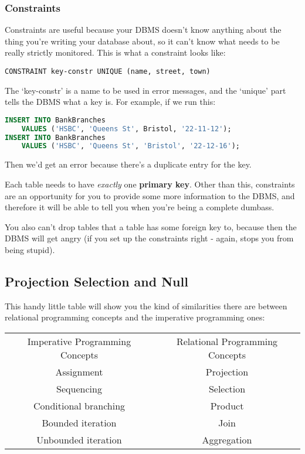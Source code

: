 \documentclass[11pt,a4paper,titlepage,dvipsnames,cmyk]{scrartcl}
\begin{document}
\subsubsection{Constraints}%
\label{ssub:Constraints}
Constraints are useful because your DBMS doesn't know anything about the
thing you're writing your database about, so it can't know what needs to
be really strictly monitored. This is what a constraint looks like:

\begin{lstlisting}[]
CONSTRAINT key-constr UNIQUE (name, street, town)
\end{lstlisting}

The `key-constr' is a name to be used in error messages, and the `unique'
part tells the DBMS what a key is. For example, if we run this:

\begin{lstlisting}[language=SQL]
INSERT INTO BankBranches
    VALUES ('HSBC', 'Queens St', Bristol, '22-11-12');
INSERT INTO BankBranches
    VALUES ('HSBC', 'Queens St', 'Bristol', '22-12-16');
\end{lstlisting}

Then we'd get an error because there's a duplicate entry for the key.

Each table needs to have \textit{exactly} one \textbf{primary key}. Other
than this, constraints are an opportunity for you to provide some more
information to the DBMS, and therefore it will be able to tell you when
you're being a complete dumbass.

You also can't drop tables that a table has some foreign key to, because
then the DBMS will get angry (if you set up the constraints right - again,
stops you from being stupid).

\subsection{Projection Selection and Null}%
\label{sub:projection}
This handy little table will show you the kind of similarities there are
between relational programming concepts and the imperative programming
ones:

\begin{center}
    \begin{tabular}{c|c}
        Imperative Programming Concepts & Relational Programming Concepts
        \\
        \hhline{=|=}
        Assignment & Projection \\
        Sequencing & Selection \\
        Conditional branching & Product \\
        Bounded iteration & Join \\
        Unbounded iteration & Aggregation
    \end{tabular}
\end{center}
\end{document}
